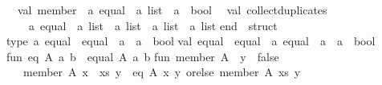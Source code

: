 \begin{isabellebody}
\begin{isamarkuptext}
\ \ val\ member\ {}\ {}a\ equal\ {}{}\ {}a\ list\ {}{}\ {}a\ {}{}\ bool\isanewline
\ \ val\ collect{}duplicates\ {}\isanewline
\ \ \ \ {}a\ equal\ {}{}\ {}a\ list\ {}{}\ {}a\ list\ {}{}\ {}a\ list\ {}{}\ {}a\ list\isanewline
end\ {}\ struct\isanewline
\isanewline
type\ {}a\ equal\ {}\ {}equal\ {}\ {}a\ {}{}\ {}a\ {}{}\ bool{}{}\isanewline
val\ equal\ {}\ {}equal\ {}\ {}a\ equal\ {}{}\ {}a\ {}{}\ {}a\ {}{}\ bool{}\isanewline
\isanewline
fun\ eq\ A{}\ a\ b\ {}\ equal\ A{}\ a\ b{}\isanewline
\isanewline
fun\ member\ A{}\ {}{}\ y\ {}\ false\isanewline
\ \ {}\ member\ A{}\ {}x\ {}{}\ xs{}\ y\ {}\ eq\ A{}\ x\ y\ orelse\ member\ A{}\ xs\ y{}\isanewline

\end{isamarkuptext}
\end{isabellebody}
